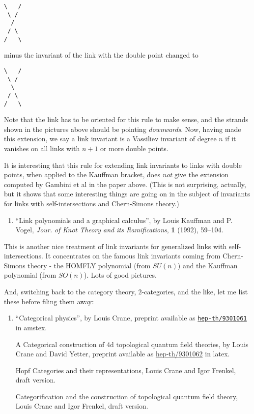 \documentclass{article}
\def\tightlist{}
\begin{document}
\begin{verbatim}
\   /
 \ /
  /
 / \
/   \
\end{verbatim}

minus the invariant of the link with the double point changed to

\begin{verbatim}
\   /
 \ /
  \
 / \
/   \
\end{verbatim}

Note that the link has to be oriented for this rule to make sense, and
the strands shown in the pictures above should be pointing
\emph{downwards}. Now, having made this extension, we say a link
invariant is a Vassiliev invariant of degree \(n\) if it vanishes on all
links with \(n+1\) or more double points.

It is interesting that this rule for extending link invariants to links
with double points, when applied to the Kauffman bracket, does
\emph{not} give the extension computed by Gambini et al in the paper
above. (This is not surprising, actually, but it shows that some
interesting things are going on in the subject of invariants for links
with self-intersections and Chern-Simons theory.)

\begin{enumerate}
\def\labelenumi{\arabic{enumi})}
\setcounter{enumi}{2}
\tightlist
\item
  ``Link polynomials and a graphical calculus'', by Louis Kauffman and
  P. Vogel, \emph{Jour. of Knot Theory and its Ramifications},
  \textbf{1} (1992), 59--104.
\end{enumerate}

This is another nice treatment of link invariants for generalized links
with self-intersections. It concentrates on the famous link invariants
coming from Chern-Simons theory - the HOMFLY polynomial (from \(SU(n)\))
and the Kauffman polynomial (from \(SO(n)\)). Lots of good pictures.

And, switching back to the category theory, 2-categories, and the like,
let me list these before filing them away:

\begin{enumerate}
\def\labelenumi{\arabic{enumi})}
\setcounter{enumi}{3}
\item
  ``Categorical physics'', by Louis Crane, preprint available as
  \href{http://xxx.lanl.gov/abs/hep-th/9301061}{\texttt{hep-th/9301061}}
  in amstex.

  A Categorical construction of 4d topological quantum field theories,
  by Louis Crane and David Yetter, preprint available as
  \href{http://xxx.lanl.gov/abs/hep-th/9301062}{hep-th/9301062} in
  latex.

  Hopf Categories and their representations, Louis Crane and Igor
  Frenkel, draft version.

  Categorification and the construction of topological quantum field
  theory, Louis Crane and Igor Frenkel, draft version.
\end{enumerate}
\end{document}
